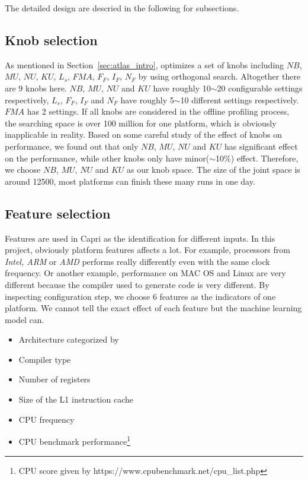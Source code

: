 The detailed design are descried in the following for subsections.

  \subsection{Knob selection}
  \label{sec:knobs}
  As mentioned in Section~\ref{sec:atlas_intro}, \atl optimizes a set of knobs
  including {$NB$, $MU$, $NU$, $KU$, $L_s$, $FMA$, $F_F$, $I_F$, $N_F$} by
  using orthogonal search. Altogether there are 9 knobs here. $NB$, $MU$, $NU$
  and $KU$ have roughly 10$\sim$20 configurable settings respectively, $L_s$,
  $F_F$, $I_F$ and $N_F$ have roughly 5$\sim$10 different settings respectively.
  $FMA$ has 2 settings. If all knobs are considered in the offline profiling
  process, the searching space is over 100 million for one platform, which is
  obviously inapplicable in reality. Based on some careful study of the
  effect of knobs on \gem performance, we found out that only $NB$, $MU$, $NU$
  and $KU$ has significant effect on the performance, while other knobs only
  have minor($\sim$10\%) effect. Therefore, we choose $NB$, $MU$, $NU$ and $KU$
  as our knob space. The size of the joint space is around 12500, most
  platforms can finish these many runs in one day.

  \subsection{Feature selection}
  \label{sec:features}
  Features are used in Capri as the identification for different inputs. In this
  project, obviously platform features affects a lot. For example, processors
  from \emph{Intel, ARM} or \emph{AMD} performs really differently even with
  the same clock frequency. Or another example, performance on MAC OS and Linux
  are very different because the compiler used to generate code is very
  different. By inspecting \atl configuration step, we choose 6 features as the
  indicators of one platform. We cannot tell the exact effect of each feature
  but the machine learning model can.
  \begin{itemize}
  \item Architecture categorized by \atl
  \item Compiler type
  \item Number of registers
  \item Size of the L1 instruction cache
  \item CPU frequency
  \item CPU benchmark performance\footnote{CPU score given by
  https://www.cpubenchmark.net/cpu\_list.php}
  \end{itemize}

